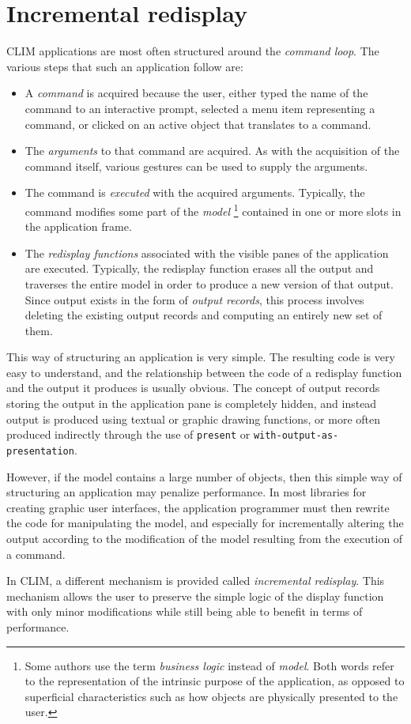 \chapter{Incremental redisplay}

CLIM applications are most often structured around the \emph{command
  loop}.  The various steps that such an application follow are:

\begin{itemize}
\item A \emph{command} is acquired because the user, either typed the
  name of the command to an interactive prompt, selected a menu item
  representing a command, or clicked on an active object that
  translates to a command.
\item The \emph{arguments} to that command are acquired.  As with the
  acquisition of the command itself, various gestures can be used to
  supply the arguments.
\item The command is \emph{executed} with the acquired arguments.
  Typically, the command modifies some part of the \emph{model}%
\footnote{Some authors use the term \emph{business logic} instead of
  \emph{model}.  Both words refer to the representation of the
  intrinsic purpose of the application, as opposed to superficial
  characteristics such as how objects are physically presented to the
  user.} contained in one or more slots in the application frame.
\item The \emph{redisplay functions} associated with the visible panes
  of the application are executed.  Typically, the redisplay function
  erases all the output and traverses the entire model in order to
  produce a new version of that output.  Since output exists in the
  form of \emph{output records}, this process involves deleting the
  existing output records and computing an entirely new set of them.
\end{itemize}

This way of structuring an application is very simple.  The resulting
code is very easy to understand, and the relationship between the code
of a redisplay function and the output it produces is usually obvious.
The concept of output records storing the output in the application
pane is completely hidden, and instead output is produced using
textual or graphic drawing functions, or more often produced
indirectly through the use of \texttt{present} or
\texttt{with-output-as-presentation}.

However, if the model contains a large number of objects, then this
simple way of structuring an application may penalize performance.  In
most libraries for creating graphic user interfaces, the application
programmer must then rewrite the code for manipulating the model, and
especially for incrementally altering the output according to the
modification of the model resulting from the execution of a command.

In CLIM, a different mechanism is provided called \emph{incremental
  redisplay}.  This mechanism allows the user to preserve the simple
logic of the display function with only minor modifications while
still being able to benefit in terms of performance.
